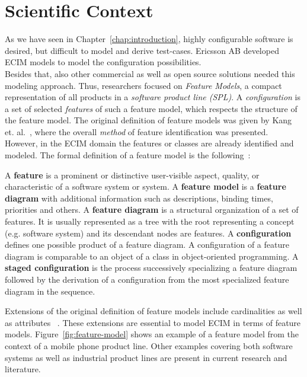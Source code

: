\section{Scientific Context}\label{sec:models-scientific}

As we have seen in Chapter~\ref{chap:introduction}, highly configurable software is desired, but difficult to model and derive test-cases. Ericsson AB developed ECIM models to model the configuration possibilities. \\
Besides that, also other commercial as well as open source solutions needed this modeling approach. Thus, researchers focused on \emph{Feature Models}, a compact representation of all products in a \emph{software product line (SPL)}. A \emph{configuration} is a set of selected \emph{features} of such a feature model, which respects the structure of the feature model.
The original definition of feature models was given by Kang et. al.~\cite{feature-ori-pl-engineering}, where the overall \emph{method} of feature identification was presented. However, in the ECIM domain the features or classes are already identified and modeled. The formal definition of a feature model is the following~\cite{feature-ori-pl-engineering, staged-configuration}:

\begin{definition}
A \textbf{feature} is a prominent or distinctive user-visible aspect, quality, or characteristic of a software system or system. A \textbf{feature model} is a \textbf{feature diagram} with additional information such as descriptions, binding times, priorities and others. A \textbf{feature diagram} is a structural organization of a set of features. It is usually represented as a tree with the root representing a concept (e.g. software system) and its descendant nodes are features. A \textbf{configuration} defines one possible product of a feature diagram. A configuration of a feature diagram is comparable to an object of a class in object-oriented programming. A \textbf{staged configuration} is the process successively specializing a feature diagram followed by the derivation of a configuration from the most specialized feature diagram in the sequence.
\end{definition}

Extensions of the original definition of feature models include cardinalities as well as attributes ~\cite{auto-reason-fm,feature-model-survey, card-based-feature-models-formalization}. These extensions are essential to model ECIM in terms of feature models. Figure~\ref{fig:feature-model} shows an example of a feature model from the context of a mobile phone product line. Other examples covering both software systems as well as industrial product lines are present in current research and literature. 

